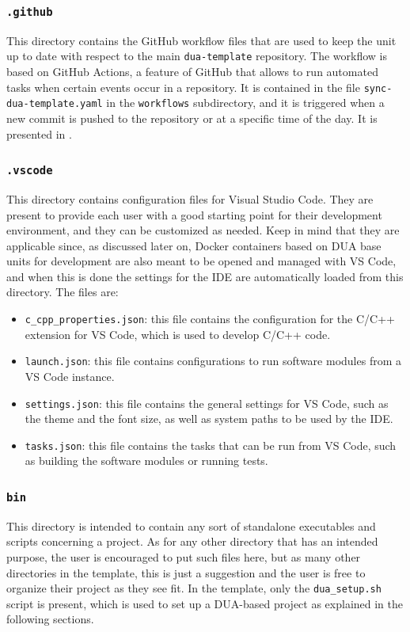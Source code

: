 \subsubsection{\texttt{.github}}
\label{sec:dua_template_layout_github}
This directory contains the GitHub workflow files that are used to keep the unit up to date with respect to the main \texttt{dua-template} repository. The workflow is based on GitHub Actions, a feature of GitHub that allows to run automated tasks when certain events occur in a repository. It is contained in the file \texttt{sync-dua-template.yaml} in the \texttt{workflows} subdirectory, and it is triggered when a new commit is pushed to the repository or at a specific time of the day. It is presented in .

\subsubsection{\texttt{.vscode}}
\label{sec:dua_template_layout_vscode}
This directory contains configuration files for Visual Studio Code. They are present to provide each user with a good starting point for their development environment, and they can be customized as needed. Keep in mind that they are applicable since, as discussed later on, Docker containers based on DUA base units for development are also meant to be opened and managed with VS Code, and when this is done the settings for the IDE are automatically loaded from this directory. The files are:
\begin{itemize}
  \item \texttt{c\_cpp\_properties.json}: this file contains the configuration for the C/C++ extension for VS Code, which is used to develop C/C++ code.
  \item \texttt{launch.json}: this file contains configurations to run software modules from a VS Code instance.
  \item \texttt{settings.json}: this file contains the general settings for VS Code, such as the theme and the font size, as well as system paths to be used by the IDE.
  \item \texttt{tasks.json}: this file contains the tasks that can be run from VS Code, such as building the software modules or running tests.
\end{itemize}

\subsubsection{\texttt{bin}}
\label{sec:dua_template_layout_bin}
This directory is intended to contain any sort of standalone executables and scripts concerning a project. As for any other directory that has an intended purpose, the user is encouraged to put such files here, but as many other directories in the template, this is just a suggestion and the user is free to organize their project as they see fit. In the template, only the \texttt{dua\_setup.sh} script is present, which is used to set up a DUA-based project as explained in the following sections.

